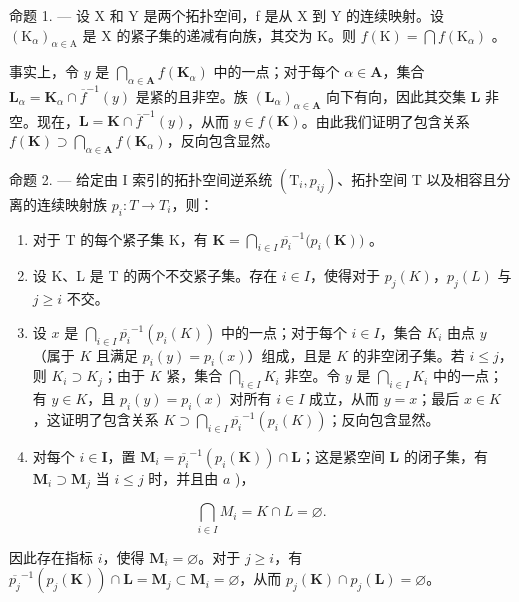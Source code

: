 命题 1. --- 设 X 和 Y 是两个拓扑空间，f 是从 X 到 Y 的连续映射。设 \((\mathrm{K}_{\alpha})_{\alpha \in \mathrm{A}}\) 是 X 的紧子集的递减有向族，其交为 K。则 \(f(\mathrm{K}) = \bigcap f(\mathrm{K}_{\alpha})\) 。

事实上，令 \(y\) 是 \(\bigcap_{\alpha \in \mathbf{A}} f(\mathbf{K}_{\alpha})\) 中的一点；对于每个 \(\alpha \in \mathbf{A}\)，集合 \(\mathbf{L}_{\alpha} = \mathbf{K}_{\alpha} \cap \overline{f}^{-1}(y)\) 是紧的且非空。族 \((\mathbf{L}_{\alpha})_{\alpha \in \mathbf{A}}\) 向下有向，因此其交集 \(\mathbf{L}\) 非空。现在，\(\mathbf{L} = \mathbf{K} \cap \overline{f}^{-1}(y)\)，从而 \(y \in f(\mathbf{K})\)。由此我们证明了包含关系 \(f(\mathbf{K}) \supset \bigcap_{\alpha \in \mathbf{A}} f(\mathbf{K}_{\alpha})\)，反向包含显然。

命题 2. --- 给定由 I 索引的拓扑空间逆系统 \((\mathrm{T}_{i}, p_{ij})\)、拓扑空间 T 以及相容且分离的连续映射族 \(p_{i}: T \to T_{i}\)，则：

\begin{enumerate}
\def\labelenumi{\alph{enumi})}
\item
  对于 T 的每个紧子集 K，有 \(\mathbf{K} = \bigcap_{i\in I}\overline{p_i}^{-1}\big(p_i(\mathbf{K})\big)\) 。
\item
  设 K、L 是 T 的两个不交紧子集。存在 \(i \in I\)，使得对于 \(p_{j}(K)\)，\(p_{j}(L)\) 与 \(j \geqslant i\) 不交。
\item
设 \(x\) 是 \(\bigcap_{i \in I} \overline{p_i}^{-1}(p_i(K))\) 中的一点；对于每个 \(i \in I\)，集合 \(K_i\) 由点 \(y\)（属于 \(K\) 且满足 \(p_i(y) = p_i(x)\)）组成，且是 \(K\) 的非空闭子集。若 \(i \leqslant j\)，则 \(K_i \supset K_j\)；由于 \(K\) 紧，集合 \(\bigcap_{i \in I} K_i\) 非空。令 \(y\) 是 \(\bigcap_{i \in I} K_i\) 中的一点；有 \(y \in K\)，且 \(p_i(y) = p_i(x)\) 对所有 \(i \in I\) 成立，从而 \(y = x\)；最后 \(x \in K\)，这证明了包含关系 \(K \supset \bigcap_{i \in I} \overline{p_i}^{-1}(p_i(K))\)；反向包含显然。
\item
  对每个 \(i \in \mathbf{I}\)，置 \(\mathbf{M}_i = \overline{p_i}^{-1}(p_i(\mathbf{K})) \cap \mathbf{L}\)；这是紧空间 \(\mathbf{L}\) 的闭子集，有 \(\mathbf{M}_i \supset \mathbf{M}_j\) 当 \(i \leqslant j\) 时，并且由 \(a\) )，
\end{enumerate}

\[
\bigcap_ {i \in I} M _ {i} = K \cap L = \varnothing .
\]

因此存在指标 \(i\)，使得 \(\mathbf{M}_i = \varnothing\)。对于 \(j \geqslant i\)，有 \(\overline{p_j}^{-1} (p_j(\mathbf{K})) \cap \mathbf{L} = \mathbf{M}_j \subset \mathbf{M}_i = \varnothing\)，从而 \(p_j(\mathbf{K}) \cap p_j(\mathbf{L}) = \varnothing\)。
